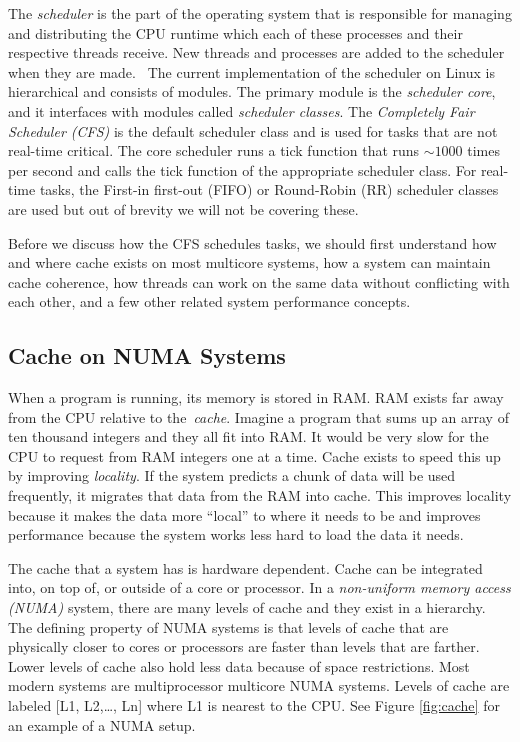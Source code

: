 \documentclass{sig-alternate}
\begin{document}
The \emph{scheduler} is the part of the operating system that is responsible for managing and distributing the CPU runtime which each of these processes and their respective threads receive. New threads and processes are added to the scheduler when they are made.~\cite{Lozi:2016} The current implementation of the scheduler on Linux is hierarchical and consists of modules. The primary module is the \emph{scheduler core}, and it interfaces with modules called \emph{scheduler classes}. The \emph{Completely Fair Scheduler (CFS)} is the default scheduler class and is used for tasks that are not real-time critical. The core scheduler runs a tick function that runs $\sim1000$ times per second and calls the tick function of the appropriate scheduler class. For real-time tasks, the First-in first-out (FIFO) or Round-Robin (RR) scheduler classes are used but out of brevity we will not be covering these.~\cite{SchedThesis}

Before we discuss how the CFS schedules tasks, we should first understand how and where cache exists on most multicore systems, how a system can maintain cache coherence, how threads can work on the same data without conflicting with each other, and a few other related system performance concepts.

\subsection{Cache on NUMA Systems}
\label{sec:cache}

When a program is running, its memory is stored in RAM. RAM exists far away from the CPU relative to the~\emph{cache}. Imagine a program that sums up an array of ten thousand integers and they all fit into RAM. It would be very slow for the CPU to request from RAM integers one at a time. Cache exists to speed this up by improving \emph{locality}. If the system predicts a chunk of data will be used frequently, it migrates that data from the RAM into cache. This improves locality because it makes the data more ``local'' to where it needs to be and improves performance because the system works less hard to load the data it needs.

The cache that a system has is hardware dependent. Cache can be integrated into, on top of, or outside of a core or processor. In a \emph{non-uniform memory access (NUMA)} system, there are many levels of cache and they exist in a hierarchy. The defining property of NUMA systems is that levels of cache that are physically closer to cores or processors are faster than levels that are farther. Lower levels of cache also hold less data because of space restrictions. Most modern systems are multiprocessor multicore NUMA systems. Levels of cache are labeled [L1, L2,\dots, Ln] where L1 is nearest to the CPU. See Figure \ref{fig:cache} for an example of a NUMA setup.
\end{document}
